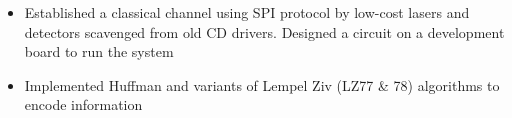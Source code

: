 \documentclass[11pt,a4paper]{article}
\begin{document}
\begin{itemize}
\begin{itemize}
        \item Established a classical channel using SPI protocol by low-cost lasers and detectors scavenged from old CD drivers. Designed a circuit on a development board to run the system
        \item Implemented Huffman and variants of Lempel Ziv (LZ77 \& 78) algorithms to encode information
    \end{itemize}

\end{itemize}
\end{document}

